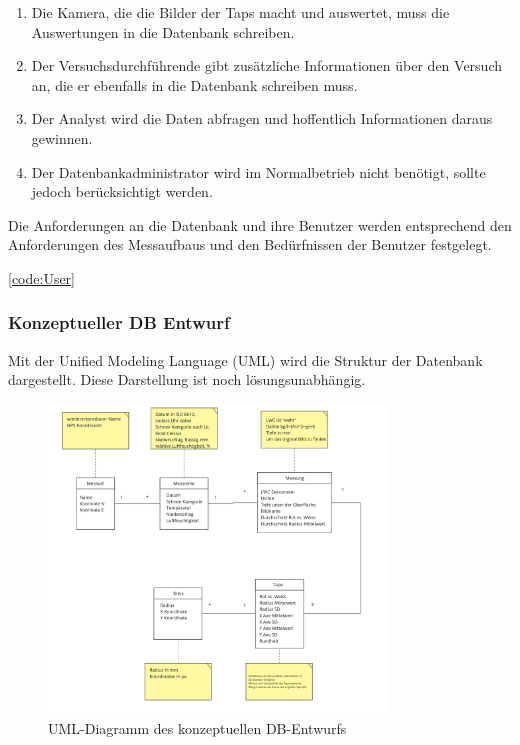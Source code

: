 \begin{enumerate}
\item Die Kamera, die die Bilder der Taps macht und auswertet, muss die Auswertungen in die Datenbank schreiben.
  \item Der Versuchsdurchführende gibt zusätzliche Informationen über den Versuch an, die er ebenfalls in die Datenbank schreiben muss.
    
    \item Der Analyst wird die Daten abfragen und hoffentlich Informationen daraus gewinnen.
    
    \item Der Datenbankadministrator wird im Normalbetrieb nicht benötigt, sollte jedoch berücksichtigt werden.
\end{enumerate}

Die Anforderungen an die Datenbank und ihre Benutzer werden entsprechend den Anforderungen des Messaufbaus und den Bedürfnissen der Benutzer festgelegt.

\ref{code:User}

\subsubsection{Konzeptueller DB Entwurf}

Mit der Unified Modeling Language (UML) wird die Struktur der Datenbank dargestellt. Diese Darstellung ist noch lösungsunabhängig.

\begin{figure}
    \centering
    \includegraphics[width=0.8\textwidth]{Bilder/Screenshotfrom2024-04-0113-01-07.png}
    \caption{UML-Diagramm des konzeptuellen DB-Entwurfs}
    \label{fig:uml-db-entwurf}
\end{figure}



